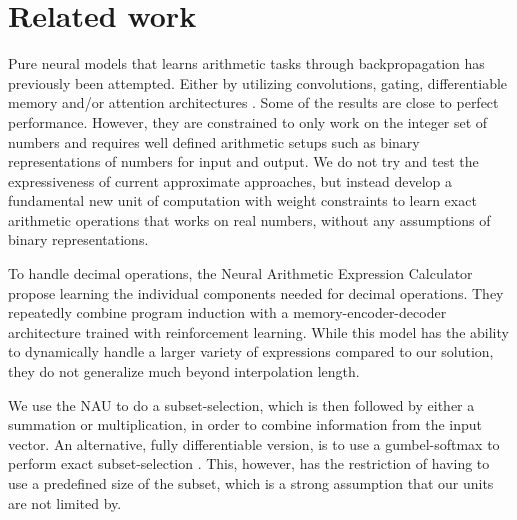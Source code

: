 \section{Related work}
Pure neural models that learns arithmetic tasks through backpropagation has previously been attempted.
Either by utilizing convolutions, gating, differentiable memory and/or attention architectures \cite{NeuralGPU,GridLSTM,NTM}.
Some of the results are close to perfect performance. However, they are constrained to only work on the integer set of numbers and requires well defined arithmetic setups such as binary representations of numbers for input and output.
We do not try and test the expressiveness of current approximate approaches, but instead develop a fundamental new unit of computation with weight constraints to learn exact arithmetic operations that works on real numbers, without any assumptions of binary representations.

To handle decimal operations, the Neural Arithmetic Expression Calculator \cite{NAEC} propose learning the individual components needed for decimal operations.
They repeatedly combine program induction with a memory-encoder-decoder architecture trained with reinforcement learning.
While this model has the ability to dynamically handle a larger variety of expressions compared to our solution, they do not generalize much beyond interpolation length.

We use the NAU to do a subset-selection, which is then followed by either a summation or multiplication, in order to combine information from the input vector.
An alternative, fully differentiable version, is to use a gumbel-softmax to perform exact subset-selection \cite{DSS}.
This, however, has the restriction of having to use a predefined size of the subset, which is a strong assumption that our units are not limited by.
